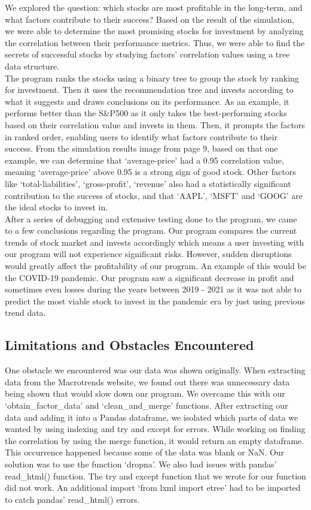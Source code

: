 \documentclass[fontsize=11pt]{article}
\begin{document}
We explored the question: which stocks are most profitable in the long-term, and what factors contribute to their success? Based on the result of the simulation, we were able to determine the most promising stocks for investment by analyzing the correlation between their performance metrics. Thus, we were able to find the secrets of successful stocks by studying factors' correlation values using a tree data structure.\\ 

The program ranks the stocks using a binary tree to group the stock by ranking for
investment. Then it uses the recommendation tree and invests according to what it suggests and draws conclusions on its performance. As an example, it performs better than the S\&P500 as it only takes the best-performing stocks based on their correlation value and invests in them. 
 Then, it prompts the factors in ranked order, enabling users to identify what factors contribute to their success. From the simulation results image from page 9, based on that one example, we can determine that `average-price' had a 0.95 correlation value, meaning `average-price' above 0.95 is a strong sign of good stock. Other factors like  `total-liabilities', `gross-profit', `revenue' also had a statistically significant  contribution to the success of stocks, and that `AAPL', `MSFT' and `GOOG' are the ideal stocks to invest in.
 \\
 
After a series of debugging and extensive testing done to the program, we came to a few conclusions regarding the program. Our program compares the current trends of stock market and invests accordingly which means a user investing with our program will not experience significant risks. However, sudden disruptions would greatly affect the profitability of our program. An example of this would be the COVID-19 pandemic. Our program saw a significant decrease in profit and sometimes even losses during the years between 2019 - 2021 as it was not able to predict the most viable stock to invest in the pandemic era by just using previous trend data.

\subsection{Limitations and Obstacles Encountered}
One obstacle we encountered was our data was shown originally. When extracting data from the Macrotrends website, we found out there was unnecessary data being shown that would slow down our program. We overcame this with our `obtain\_factor\_data' and `clean\_and\_merge' functions. After extracting our data and adding it into a Pandas dataframe, we isolated which parts of data we wanted by using indexing and try and except for errors. While working on finding the correlation by using the merge function, it would return an empty dataframe. This occurrence happened because some of the data was blank or NaN. Our solution was to use the function `dropna'. We also had issues with pandas' read\_html() function. The try and except function that we wrote for our function did not work. An additional import `from lxml import etree' had to be imported to catch pandas' read\_html() errors.
\\
\end{document}
